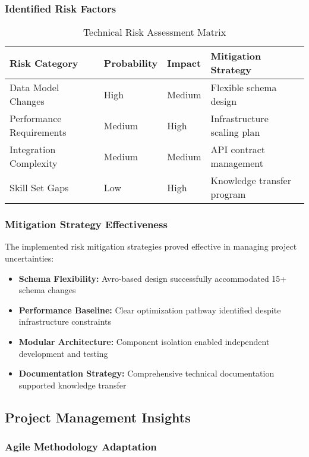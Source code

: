 \subsubsection{Identified Risk Factors}

\begin{table}[h]
\centering
\begin{tabular}{|l|l|l|l|}
\hline
\textbf{Risk Category} & \textbf{Probability} & \textbf{Impact} & \textbf{Mitigation Strategy} \\
\hline
Data Model Changes & High & Medium & Flexible schema design \\
Performance Requirements & Medium & High & Infrastructure scaling plan \\
Integration Complexity & Medium & Medium & API contract management \\
Skill Set Gaps & Low & High & Knowledge transfer program \\
\hline
\end{tabular}
\caption{Technical Risk Assessment Matrix}
\end{table}

\subsubsection{Mitigation Strategy Effectiveness}

The implemented risk mitigation strategies proved effective in managing project uncertainties:

\begin{itemize}
    \item \textbf{Schema Flexibility:} Avro-based design successfully accommodated 15+ schema changes
    \item \textbf{Performance Baseline:} Clear optimization pathway identified despite infrastructure constraints
    \item \textbf{Modular Architecture:} Component isolation enabled independent development and testing
    \item \textbf{Documentation Strategy:} Comprehensive technical documentation supported knowledge transfer
\end{itemize}

\subsection{Project Management Insights}

\subsubsection{Agile Methodology Adaptation}


